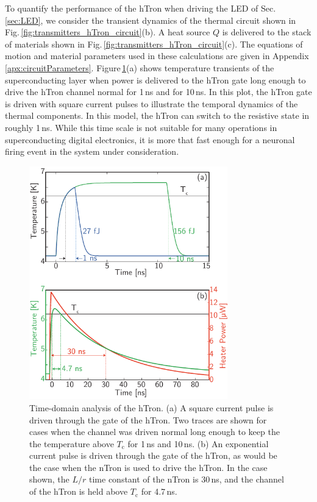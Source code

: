 \documentclass[twocolumn]{article}
\begin{document}
To quantify the performance of the hTron when driving the LED of Sec.\,\ref{sec:LED}, we consider the transient dynamics of the thermal circuit shown in Fig.\,\ref{fig:transmitters_hTron_circuit}(b). A heat source $Q$ is delivered to the stack of materials shown in Fig.\,\ref{fig:transmitters_hTron_circuit}(c). The equations of motion and material parameters used in these calculations are given in Appendix \ref{apx:circuitParameters}. Figure\,\ref{fig:transmitters_hTron_data_1}(a) shows temperature transients of the superconducting layer when power is delivered to the hTron gate long enough to drive the hTron channel normal for 1\,ns and for 10\,ns. In this plot, the hTron gate is driven with square current pulses to illustrate the temporal dynamics of the thermal components. In this model, the hTron can switch to the resistive state in roughly 1\,ns. While this time scale is not suitable for many operations in superconducting digital electronics, it is more that fast enough for a neuronal firing event in the system under consideration.  
\begin{figure}[t!]
	\centerline{\includegraphics[width=8.6cm]{_transmitters_hTron_data_1_small.pdf}}
	\caption{\label{fig:transmitters_hTron_data_1}Time-domain analysis of the hTron. (a) A square current pulse is driven through the gate of the hTron. Two traces are shown for cases when the channel was driven normal long enough to keep the the temperature above $T_{\mathrm{c}}$ for 1\,ns and 10\,ns. (b) An exponential current pulse is driven through the gate of the hTron, as would be the case when the nTron is used to drive the hTron. In the case shown, the $L/r$ time constant of the nTron is 30\,ns, and the channel of the hTron is held above $T_{\mathrm{c}}$ for 4.7\,ns.}
\end{figure}
\end{document}
